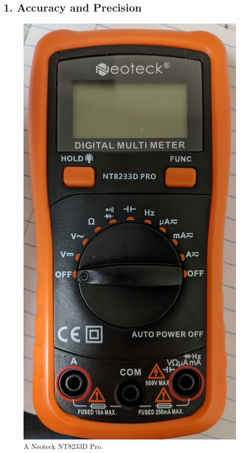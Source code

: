\documentclass[12pt]{article}
\begin{document}
\subsection*{1. Accuracy and Precision}

\begin{figure}[H]
    \centering
    \includegraphics[width=0.3\linewidth]{multimeter.jpg}
    \caption{A Neoteck NT8233D Pro.}
    \label{fig:multimeter}
\end{figure}
\end{document}
